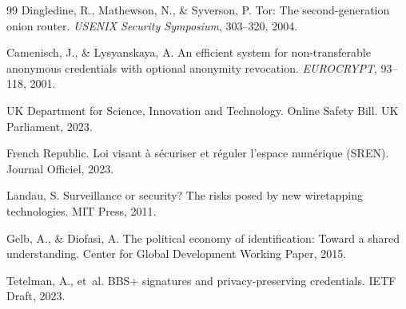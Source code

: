 \documentclass[11pt,a4paper]{article}
\begin{document}
\begin{thebibliography}{99}
Dingledine, R., Mathewson, N., \& Syverson, P.
\newblock Tor: The second-generation onion router.
\newblock \emph{USENIX Security Symposium}, 303--320, 2004.

Camenisch, J., \& Lysyanskaya, A.
\newblock An efficient system for non-transferable anonymous credentials with optional anonymity revocation.
\newblock \emph{EUROCRYPT}, 93--118, 2001.

UK Department for Science, Innovation and Technology.
\newblock Online Safety Bill.
\newblock UK Parliament, 2023.

French Republic.
\newblock Loi visant \`{a} s\'{e}curiser et r\'{e}guler l'espace num\'{e}rique (SREN).
\newblock Journal Officiel, 2023.

Landau, S.
\newblock Surveillance or security? The risks posed by new wiretapping technologies.
\newblock MIT Press, 2011.

Gelb, A., \& Diofasi, A.
\newblock The political economy of identification: Toward a shared understanding.
\newblock Center for Global Development Working Paper, 2015.

Tetelman, A., et~al.
\newblock BBS+ signatures and privacy-preserving credentials.
\newblock IETF Draft, 2023.

\end{thebibliography}
\end{document}

